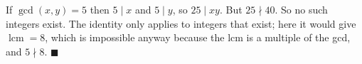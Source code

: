If $\gcd(x,y)=5$ then $5\mid x$ and $5\mid y$, so $25\mid xy$. But $25\nmid40$. So no such integers exist. The identity only applies to integers that exist; here it would give $\operatorname{lcm}=8$, which is impossible anyway because the lcm is a multiple of the gcd, and $5\nmid8$. $\blacksquare$
